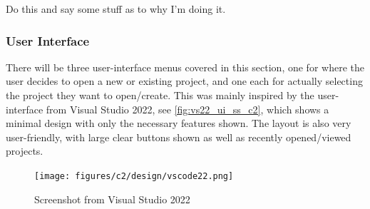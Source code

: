 \documentclass[11pt]{article}
\begin{document}
                Do this and say some stuff as to why I'm doing it.


            \subsubsection{User Interface}


                

                There will be three user-interface menus covered in this section, one for where the user decides to open a new or existing project, and one each for actually selecting the project they want to open/create. This was mainly inspired by the user-interface from Visual Studio 2022, see \autoref{fig:vs22_ui_ss_c2}, which shows a minimal design with only the necessary features shown. The layout is also very user-friendly, with large clear buttons shown as well as recently opened/viewed projects.

                \begin{figure}[!ht]
                    \centering
                    \texttt{[image: figures/c2/design/vscode22.png]}
                    \caption{Screenshot from Visual Studio 2022}
                    \label{fig:vs22_ui_ss_c2}
                \end{figure}
\end{document}
